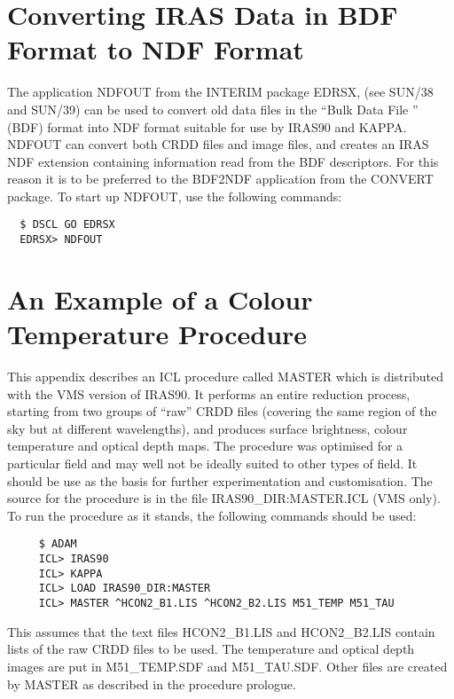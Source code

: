 \section{Converting IRAS Data in BDF Format to NDF Format}
The application {\small NDFOUT} from the {\small INTERIM} package
{\small EDRSX}, (see SUN/38 and SUN/39) can be used to convert old data
files in the ``Bulk Data File '' ({\small BDF}) format into {\small
NDF} format suitable for use by  {\small IRAS90} and {\small KAPPA}.
{\small NDFOUT} can convert both {\small CRDD} files and image files,
and creates an {\small IRAS NDF} extension containing information read
from  the {\small BDF} descriptors. For this reason  it is to be
preferred to the {\small BDF2NDF} application from the {\small CONVERT}
package. To start up {\small NDFOUT}, use the following commands:

\small
\begin{verbatim}
  $ DSCL GO EDRSX
  EDRSX> NDFOUT
\end{verbatim}
\normalsize

\section{An Example of a Colour Temperature Procedure}
\label{APP:MAS}
This appendix describes an {\small ICL} procedure called {\small MASTER}
which is distributed with the {\small VMS} version of {\small IRAS90}. It
performs an entire reduction process, starting from two groups of ``raw''
{\small CRDD} files (covering the same region of the sky but at different
wavelengths), and produces surface brightness, colour temperature and optical
depth maps. The procedure was optimised for a particular field and may well
not be ideally suited to other types of field. It should be use as the
basis for further experimentation and customisation. The source for the
procedure is in the file {\small IRAS90\_DIR:MASTER.ICL} ({\small VMS} only).
To run the procedure as it stands, the following commands should be used:

\small
\begin{verbatim}
     $ ADAM
     ICL> IRAS90
     ICL> KAPPA
     ICL> LOAD IRAS90_DIR:MASTER
     ICL> MASTER ^HCON2_B1.LIS ^HCON2_B2.LIS M51_TEMP M51_TAU
\end{verbatim}
\normalsize

This assumes that the text files {\small HCON2\_B1.LIS} and {\small HCON2\_B2.LIS}
contain lists of the raw {\small CRDD} files to be used. The temperature and
optical depth images are put in {\small M51\_TEMP.SDF} and {\small M51\_TAU.SDF}. Other
files are created by {\small MASTER} as described in the procedure prologue.

